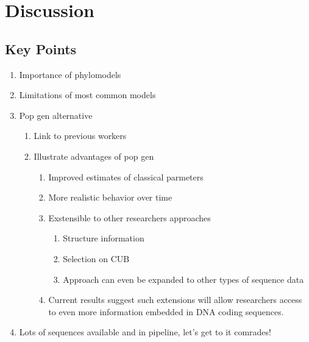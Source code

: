 \documentclass{article}
\begin{document}
\section*{Discussion}
\subsection*{Key Points}
\begin{enumerate}
\item Importance of phylomodels
\item Limitations of most  common models
\item Pop gen alternative
  \begin{enumerate}
  \item Link to previous workers
  \item Illustrate advantages of pop gen
    \begin{enumerate}
    \item Improved estimates of classical parmeters
    \item More realistic behavior over time
    \item Exstensible to other researchers approaches
      \begin{enumerate}
      \item Structure information
      \item Selection on CUB
      \item Approach can even be expanded to other types of sequence data
      \end{enumerate}

    \item Current results suggest such extensions will allow researchers access to even more information embedded in DNA coding sequences.

    \end{enumerate}
  \end{enumerate}
\item Lots of sequences available and in pipeline, let's get to it comrades!
\end{enumerate}
\end{document}
